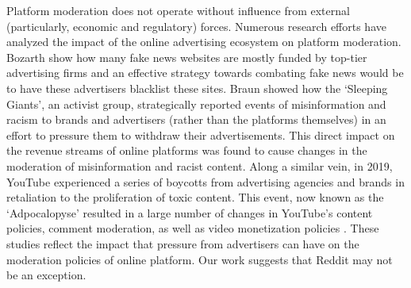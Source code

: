 Platform moderation does not operate without influence from external
(particularly, economic and regulatory) forces. Numerous research efforts have
analyzed the impact of the online advertising ecosystem on platform moderation.
Bozarth \etal \cite{bozarth2021market} show how many fake news websites are
mostly funded by top-tier advertising firms and an effective strategy towards
combating fake news would be to have these advertisers blacklist these sites.
Braun \etal \cite{braun2019activism} showed how the `Sleeping Giants', an
activist group, strategically reported events of misinformation and racism to
brands and advertisers (rather than the platforms themselves) in an effort to
pressure them to withdraw their advertisements. This direct impact on the
revenue streams of online platforms was found to cause changes in the
moderation of misinformation and racist content. Along a similar vein, in 2019,
YouTube experienced
a series of boycotts from advertising agencies and brands in retaliation to the
proliferation of toxic content. This event, now known as the `Adpocalopyse'
resulted in a large number of changes in YouTube's content policies, comment
moderation, as well as video monetization policies \cite{kumar2019algorithmic,
caplan2020youtube}. These studies reflect the impact that
pressure from advertisers can have on the moderation policies of online
platform. Our work suggests that Reddit may not be an exception. 
% 

